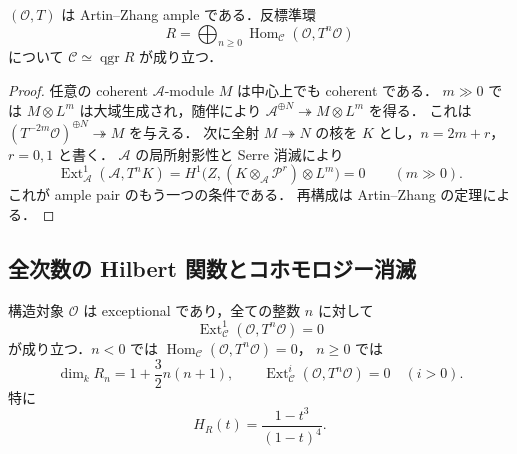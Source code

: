 \begin{proposition}
\label{prop:ample-degree-three}
$(\mathcal O,T)$ は Artin--Zhang ample である．反標準環
\[
 R=\bigoplus_{n\ge0}\operatorname{Hom}_{\mathcal C}
                  (\mathcal O,T^n\mathcal O)
\]
について $\mathcal C\simeq\operatorname{qgr}R$ が成り立つ．
\end{proposition}

\begin{proof}
任意の coherent $\mathcal A$-module $M$ は中心上でも coherent である．
$m\gg0$ では $M\otimes L^m$ は大域生成され，随伴により
$\mathcal A^{\oplus N}\twoheadrightarrow M\otimes L^m$ を得る．
これは $(T^{-2m}\mathcal O)^{\oplus N}\twoheadrightarrow M$ を与える．
次に全射 $M\twoheadrightarrow N$ の核を $K$ とし，$n=2m+r$，$r=0,1$ と書く．
$\mathcal A$ の局所射影性と Serre 消滅により
\[
 \operatorname{Ext}^1_{\mathcal A}(\mathcal A,T^nK)
 =H^1\bigl(Z,(K\otimes_{\mathcal A}\mathcal P^r)\otimes L^m\bigr)=0
 \qquad(m\gg0).
\]
これが ample pair のもう一つの条件である．
再構成は Artin--Zhang の定理\cite[Theorem~4.5]{AZ1994}による．
\end{proof}

\subsection{全次数の Hilbert 関数とコホモロジー消滅}

\begin{proposition}
\label{prop:Hilbert-degree-three}
構造対象 $\mathcal O$ は exceptional であり，全ての整数 $n$ に対して
\[
 \operatorname{Ext}^1_{\mathcal C}(\mathcal O,T^n\mathcal O)=0
\]
が成り立つ．$n<0$ では
$\operatorname{Hom}_{\mathcal C}(\mathcal O,T^n\mathcal O)=0$，
$n\ge0$ では
\begin{equation}
 \dim_k R_n=1+\frac32n(n+1),\qquad
 \operatorname{Ext}^{i}_{\mathcal C}(\mathcal O,T^n\mathcal O)=0
 \quad(i>0).
 \label{eq:Hilbert-degree-three}
\end{equation}
特に
\[
 H_R(t)=\frac{1-t^3}{(1-t)^4}.
\]
\end{proposition}

